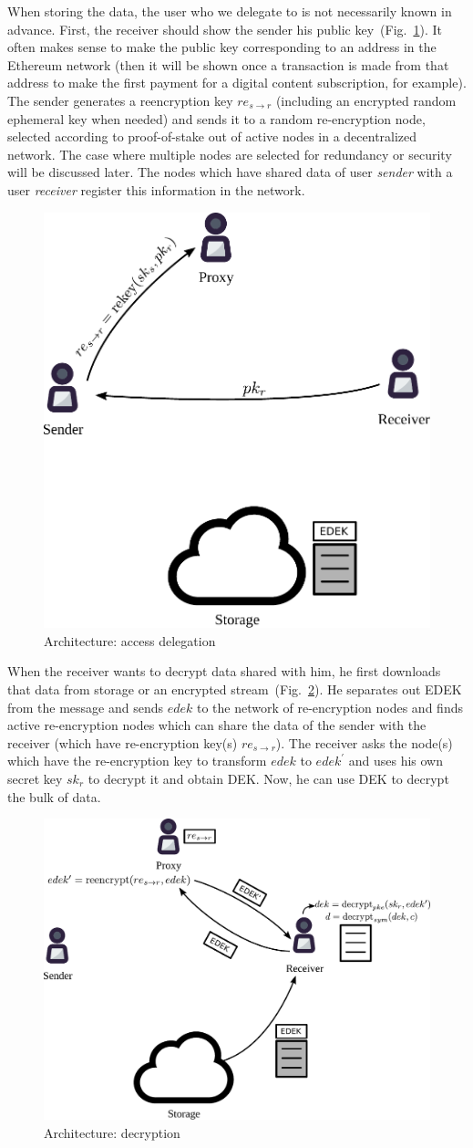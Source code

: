 \documentclass[notitlepage,longbibliography]{revtex4-1}
\begin{document}
When storing the data, the user who we delegate to is not necessarily known in advance.
First, the receiver should show the sender his public key~(Fig.~\ref{fig:arch-delegate}).
It often makes sense to make the public key corresponding to an address in the Ethereum network (then it will be shown once a transaction is made from that
address to make the first payment for a digital content subscription, for example).
The sender generates a reencryption key $re_{s\rightarrow r}$ (including an encrypted random ephemeral key when needed) and sends it to a random re-encryption
node, selected according to proof-of-stake out of active nodes in a decentralized network.
The case where multiple nodes are selected for redundancy or security will be discussed later.
The nodes which have shared data of user \emph{sender} with a user \emph{receiver} register this information in the network.
\begin{figure}
\centering
    \includegraphics[width=0.4\columnwidth]{pdf/delegate.pdf}
    \caption{Architecture: access delegation}
    \label{fig:arch-delegate}
\end{figure}

When the receiver wants to decrypt data shared with him, he first downloads that data from storage or an encrypted stream~(Fig.~\ref{fig:arch-decrypt}).
He separates out EDEK from the message and sends $edek$ to the network of re-encryption nodes and finds active re-encryption nodes which can share the data
of the sender with the receiver (which have re-encryption key(s) $re_{s\rightarrow r}$).
The receiver asks the node(s) which have the re-encryption key to transform $edek$ to $edek^{\prime}$ and uses his own secret key $sk_r$ to decrypt it and
obtain DEK.
Now, he can use DEK to decrypt the bulk of data.
\begin{figure}
\centering
    \includegraphics[width=0.6\columnwidth]{pdf/decrypt.pdf}
    \caption{Architecture: decryption}
    \label{fig:arch-decrypt}
\end{figure}
\end{document}
